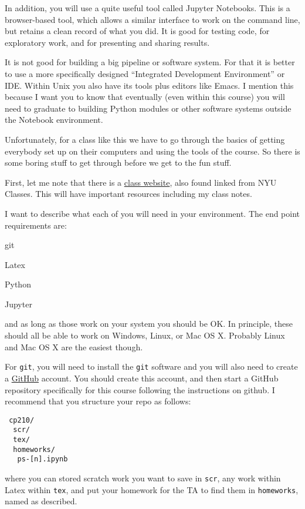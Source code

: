 In addition, you will use a quite useful tool called Jupyter
Notebooks. This is a browser-based tool, which allows a similar
interface to work on the command line, but retains a clean record of
what you did. It is good for testing code, for exploratory work, and
for presenting and sharing results.

It is not good for building a big pipeline or software system. For
that it is better to use a more specifically designed ``Integrated
Development Environment'' or IDE. Within Unix you also have its tools
plus editors like Emacs. I mention this because I want you to know
that eventually (even within this course) you will need to graduate to
building Python modules or other software systems outside the Notebook
environment.

Unfortunately, for a class like this we have to go through the basics
of getting everybody set up on their computers and using the tools of
the course. So there is some boring stuff to get through before we get
to the fun stuff. 

First, let me note that there is a
\href{https://blanton144.github.io/computational/}{\color{red} class
  website}, also found linked from NYU Classes. This will have
important resources including my class notes.

I want to describe what each of you will need in your environment. The
end point requirements are:
\begin{ditemize}
\item git
\item Latex
\item Python
\item Jupyter
\end{ditemize}
and as long as those work on your system you should be OK. In
principle, these should all be able to work on Windows, Linux, or Mac
OS X. Probably Linux and Mac OS X are the easiest though.

For {\tt git}, you will need to install the {\tt git} software and you
will also need to create a \href{http://github.com}{\color{red}
  GitHub} account. You should create this account, and then start a
GitHub repository specifically for this course following the
instructions on github. I recommend that you structure your repo as
follows:
\begin{verbatim}
 cp210/
  scr/
  tex/ 
  homeworks/
   ps-[n].ipynb
\end{verbatim}
where you can stored scratch work you want to save in {\tt scr}, any
work within Latex within {\tt tex}, and put your homework for the TA
to find them in {\tt homeworks}, named as described. 


